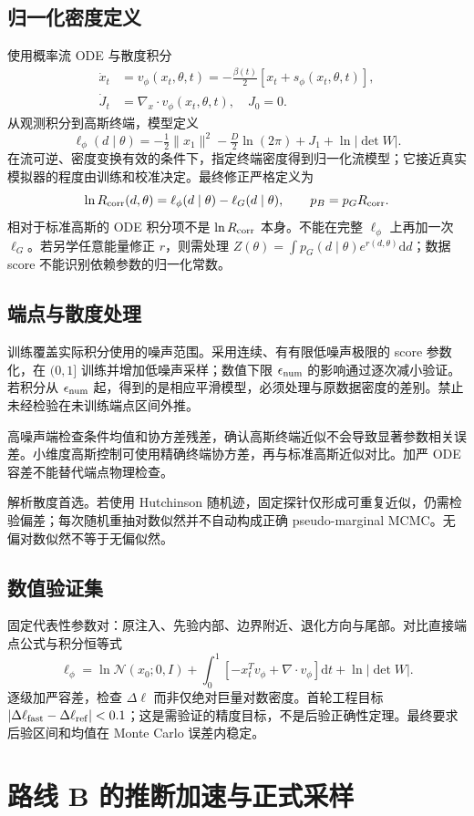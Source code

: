 \documentclass[UTF8,fontset=none,a4paper,11pt]{ctexart}
\newcommand{\dd}{\mathrm d}\newcommand{\GB}{\mathrm{DWD}}\newcommand{\AST}{\mathrm{ast}}\newcommand{\SW}{\mathrm{SW}}
\newcommand{\chapterpage}[1]{\section{#1}}
\begin{document}
\subsection{归一化密度定义}
使用概率流 ODE 与散度积分
\begin{align}
\dot x_t&=v_\phi(x_t,\theta,t)=-\frac{\beta(t)}2[x_t+s_\phi(x_t,\theta,t)],\\
\dot J_t&=\nabla_x\cdot v_\phi(x_t,\theta,t),\quad J_0=0.
\end{align}
从观测积分到高斯终端，模型定义
\begin{equation}
\ell_\phi(d\mid\theta)=-\tfrac12\|x_1\|^2-\tfrac D2\ln(2\pi)+J_1+\ln|\det W|.
\end{equation}
在流可逆、密度变换有效的条件下，指定终端密度得到归一化流模型；它接近真实模拟器的程度由训练和校准决定。最终修正严格定义为
\begin{equation}
\ln R_{\rm corr}(d,\theta)=\ell_\phi(d\mid\theta)-\ell_G(d\mid\theta),\qquad p_B=p_G R_{\rm corr}.
\end{equation}
相对于标准高斯的 ODE 积分项不是 $\ln R_{\rm corr}$ 本身。不能在完整 $\ell_\phi$ 上再加一次 $\ell_G$。若另学任意能量修正 $r$，则需处理 $Z(\theta)=\int p_G(d\mid\theta)e^{r(d,\theta)}\dd d$；数据 score 不能识别依赖参数的归一化常数。
\subsection{端点与散度处理}
训练覆盖实际积分使用的噪声范围。采用连续、有有限低噪声极限的 score 参数化，在 $(0,1]$ 训练并增加低噪声采样；数值下限 $\epsilon_{\rm num}$ 的影响通过逐次减小验证。若积分从 $\epsilon_{\rm num}$ 起，得到的是相应平滑模型，必须处理与原数据密度的差别。禁止未经检验在未训练端点区间外推。
\par 高噪声端检查条件均值和协方差残差，确认高斯终端近似不会导致显著参数相关误差。小维度高斯控制可使用精确终端协方差，再与标准高斯近似对比。加严 ODE 容差不能替代端点物理检查。
\par 解析散度首选。若使用 Hutchinson 随机迹，固定探针仅形成可重复近似，仍需检验偏差；每次随机重抽对数似然并不自动构成正确 pseudo-marginal MCMC。无偏对数似然不等于无偏似然。
\subsection{数值验证集}
固定代表性参数对：原注入、先验内部、边界附近、退化方向与尾部。对比直接端点公式与积分恒等式
\begin{equation}
\ell_\phi=\ln\mathcal N(x_0;0,I)+\int_0^1[-x_t^Tv_\phi+\nabla\cdot v_\phi]\dd t+\ln|\det W|.
\end{equation}
逐级加严容差，检查 $\Delta\ell$ 而非仅绝对巨量对数密度。首轮工程目标 $|\Delta\ell_{\rm fast}-\Delta\ell_{\rm ref}|<0.1$；这是需验证的精度目标，不是后验正确性定理。最终要求后验区间和均值在 Monte Carlo 误差内稳定。
\chapterpage{路线 B 的推断加速与正式采样}
\end{document}
